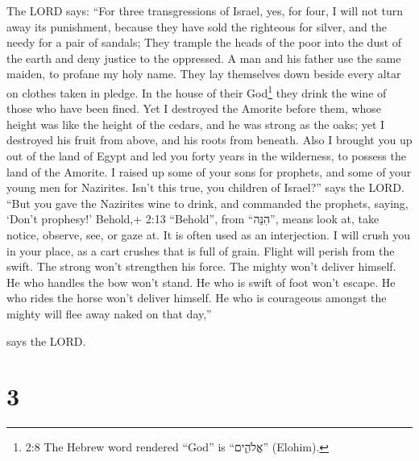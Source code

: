  The LORD says: ``For three transgressions of Israel, yes,
for four, I will not turn away its punishment, because they have sold
the righteous for silver, and the needy for a pair of sandals;
 They trample the heads of the poor into the dust of the
earth and deny justice to the oppressed. A man and his father use the
same maiden, to profane my holy name.  They lay themselves
down beside every altar on clothes taken in pledge. In the house of
their God\footnote{2:8 The Hebrew word rendered ``God'' is ``אֱלֹהִ֑ים''
  (Elohim).} they drink the wine of those who have been fined.
 Yet I destroyed the Amorite before them, whose height was
like the height of the cedars, and he was strong as the oaks; yet I
destroyed his fruit from above, and his roots from beneath.
 Also I brought you up out of the land of Egypt and led you
forty years in the wilderness, to possess the land of the Amorite.
 I raised up some of your sons for prophets, and some of
your young men for Nazirites. Isn't this true, you children of Israel?''
says the LORD.  ``But you gave the Nazirites wine to drink,
and commanded the prophets, saying, `Don't prophesy!' 
Behold,+ 2:13 ``Behold'', from ``הִנֵּה'', means look at, take notice,
observe, see, or gaze at. It is often used as an interjection. I will
crush you in your place, as a cart crushes that is full of grain.
 Flight will perish from the swift. The strong won't
strengthen his force. The mighty won't deliver himself.  He
who handles the bow won't stand. He who is swift of foot won't escape.
He who rides the horse won't deliver himself.  He who is
courageous amongst the mighty will flee away naked on that day,''

says the LORD.

\hypertarget{section-2}{%
\section{3}\label{section-2}}

